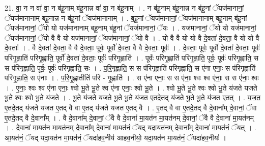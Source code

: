 \documentclass[17pt]{extarticle}
\begin{document}
21. वा॒ न न वा॑ वा॒ न ब॑हू॒नाम् ब॑हू॒नान्न वा॑ वा॒ न ब॑हू॒नाम् । . न ब॑हू॒नाम् ब॑हू॒नान्न न ब॑हू॒नां ॅयज॑मानानां॒ ॅयज॑मानानाम् बहू॒नान्न न ब॑हू॒नां ॅयज॑मानानाम् । . ब॒हू॒नां ॅयज॑मानानां॒ ॅयज॑मानानाम् बहू॒नाम् ब॑हू॒नां ॅयज॑मानानां॒ ॅयो यो यज॑मानानाम् बहू॒नाम् ब॑हू॒नां ॅयज॑मानानां॒ ॅयः । . यज॑मानानां॒ ॅयो यो यज॑मानानां॒ ॅयज॑मानानां॒ ॅयो वै वै यो यज॑मानानां॒ ॅयज॑मानानां॒ ॅयो वै । . यो वै वै यो यो वै दे॒वता॑ दे॒वता॒ वै यो यो वै दे॒वताः᳚ । . वै दे॒वता॑ दे॒वता॒ वै वै दे॒वताः॒ पूर्वः॒ पूर्वो॑ दे॒वता॒ वै वै दे॒वताः॒ पूर्वः॑ । . दे॒वताः॒ पूर्वः॒ पूर्वो॑ दे॒वता॑ दे॒वताः॒ पूर्वः॑ परिगृ॒ह्णाति॑ परिगृ॒ह्णाति॒ पूर्वो॑ दे॒वता॑ दे॒वताः॒ पूर्वः॑ परिगृ॒ह्णाति॑ । . पूर्वः॑ परिगृ॒ह्णाति॑ परिगृ॒ह्णाति॒ पूर्वः॒ पूर्वः॑ परिगृ॒ह्णाति॒ स स प॑रिगृ॒ह्णाति॒ पूर्वः॒ पूर्वः॑ परिगृ॒ह्णाति॒ सः । . प॒रि॒गृ॒ह्णाति॒ स स प॑रिगृ॒ह्णाति॑ परिगृ॒ह्णाति॒ स ए॑ना एनाः॒ स प॑रिगृ॒ह्णाति॑ परिगृ॒ह्णाति॒ स ए॑नाः । . प॒रि॒गृ॒ह्णातीति॑ परि - गृ॒ह्णाति॑ । . स ए॑ना एनाः॒ स स ए॑नाः॒ श्वः श्व ए॑नाः॒ स स ए॑नाः॒ श्वः । . ए॒नाः॒ श्वः श्व ए॑ना एनाः॒ श्वो भू॒ते भू॒ते श्व ए॑ना एनाः॒ श्वो भू॒ते । . श्वो भू॒ते भू॒ते श्वः श्वो भू॒ते य॑जते यजते भू॒ते श्वः श्वो भू॒ते य॑जते । . भू॒ते य॑जते यजते भू॒ते भू॒ते य॑जत ए॒तदे॒तद् य॑जते भू॒ते भू॒ते य॑जत ए॒तत् । . य॒ज॒त॒ ए॒तदे॒तद् य॑जते यजत ए॒तद् वै वा ए॒तद् य॑जते यजत ए॒तद् वै । . ए॒तद् वै वा ए॒तदे॒तद् वै दे॒वाना᳚म् दे॒वानां॒ ॅवा ए॒तदे॒तद् वै दे॒वाना᳚म् । . वै दे॒वाना᳚म् दे॒वानां॒ ॅवै वै दे॒वाना॑ मा॒यत॑न मा॒यत॑नम् दे॒वानां॒ ॅवै वै दे॒वाना॑ मा॒यत॑नम् । . दे॒वाना॑ मा॒यत॑न मा॒यत॑नम् दे॒वाना᳚म् दे॒वाना॑ मा॒यत॑नं॒ ॅयद् यदा॒यत॑नम् दे॒वाना᳚म् दे॒वाना॑ मा॒यत॑नं॒ ॅयत् । . आ॒यत॑नं॒ ॅयद् यदा॒यत॑न मा॒यत॑नं॒ ॅयदा॑हव॒नीय॑ आहव॒नीयो॒ यदा॒यत॑न मा॒यत॑नं॒ ॅयदा॑हव॒नीयः॑ । \newline
\end{document}
